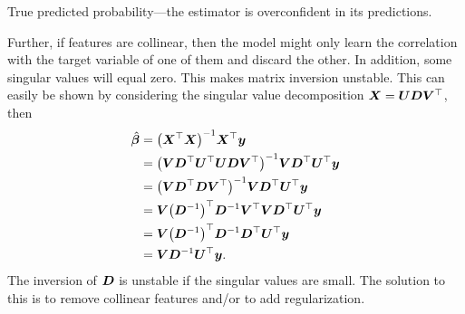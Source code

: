 \begin{marginfigure}
    \caption{True \vs predicted probability---the estimator is overconfident in its predictions.}
    \label{fig:overconfidence}
\end{marginfigure}

Further, if features are collinear, then the model might only learn the correlation with the target
variable of one of them and discard the other. In addition, some singular values will equal zero.
This makes matrix inversion unstable. This can easily be shown by considering the singular value
decomposition $\bm{X} = \bm{U} \bm{D} \bm{V}^\top$, then
\begin{align*}
    \hat{\vec{\beta}} & = \inv{\lft( \transpose{\mat{X}} \mat{X} \rgt)} \transpose{\mat{X}} \vec{y}                                                                                     \\
                      & = \inv{\lft( \mat{V} \transpose{\mat{D}} \transpose{\mat{U}} \mat{U} \mat{D} \transpose{\mat{V}} \rgt)} \mat{V} \transpose{\mat{D}} \transpose{\mat{U}} \vec{y} \\
                      & = \inv{\lft( \mat{V} \transpose{\mat{D}} \mat{D} \transpose{\mat{V}} \rgt)} \mat{V} \transpose{\mat{D}} \transpose{\mat{U}} \vec{y}                             \\
                      & = \mat{V} \transpose{\lft( \inv{\mat{D}} \rgt)} \inv{\mat{D}} \transpose{\mat{V}} \mat{V} \transpose{\mat{D}} \transpose{\mat{U}} \vec{y}                       \\
                      & = \mat{V} \transpose{\lft( \inv{\mat{D}} \rgt)} \inv{\mat{D}} \transpose{\mat{D}} \transpose{\mat{U}} \vec{y}                                                   \\
                      & = \mat{V} \inv{\mat{D}} \transpose{\mat{U}} \vec{y}.
\end{align*}
The inversion of $\bm{D}$ is unstable if the singular values are small. The solution to this is to
remove collinear features and/or to add regularization.

